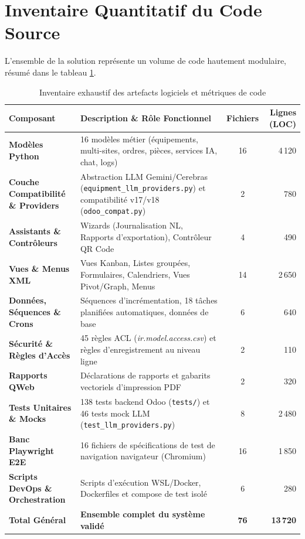 \section{Inventaire Quantitatif du Code Source}
L'ensemble de la solution représente un volume de code hautement modulaire, résumé dans le tableau \ref{tab:code_inventory}.

\begin{table}[!ht]
\centering
\small
\renewcommand{\arraystretch}{1.15}
\begin{tabularx}{\textwidth}{l p{7.2cm} c r}
\toprule
\textbf{Composant} & \textbf{Description \& Rôle Fonctionnel} & \textbf{Fichiers} & \textbf{Lignes (LOC)} \\
\midrule
\textbf{Modèles Python} & 16 modèles métier (équipements, multi-sites, ordres, pièces, services IA, chat, logs) & 16 & 4\,120 \\
\textbf{Couche Compatibilité \& Providers} & Abstraction LLM Gemini/Cerebras (\texttt{equipment\_llm\_providers.py}) et compatibilité v17/v18 (\texttt{odoo\_compat.py}) & 2 & 780 \\
\textbf{Assistants \& Contrôleurs} & Wizards (Journalisation NL, Rapports d'exportation), Contrôleur QR Code & 4 & 490 \\
\textbf{Vues \& Menus XML} & Vues Kanban, Listes groupées, Formulaires, Calendriers, Vues Pivot/Graph, Menus & 14 & 2\,650 \\
\textbf{Données, Séquences \& Crons} & Séquences d'incrémentation, 18 tâches planifiées automatiques, données de base & 6 & 640 \\
\textbf{Sécurité \& Règles d'Accès} & 45 règles ACL (\textit{ir.model.access.csv}) et règles d'enregistrement au niveau ligne & 2 & 110 \\
\textbf{Rapports QWeb} & Déclarations de rapports et gabarits vectoriels d'impression PDF & 2 & 320 \\
\textbf{Tests Unitaires \& Mocks} & 138 tests backend Odoo (\texttt{tests/}) et 46 tests mock LLM (\texttt{test\_llm\_providers.py}) & 8 & 2\,480 \\
\textbf{Banc Playwright E2E} & 16 fichiers de spécifications de test de navigation navigateur (Chromium) & 16 & 1\,850 \\
\textbf{Scripts DevOps \& Orchestration} & Scripts d'exécution WSL/Docker, Dockerfiles et compose de test isolé & 6 & 280 \\
\midrule
\textbf{Total Général} & \textbf{Ensemble complet du système validé} & \textbf{76} & \textbf{13\,720} \\
\bottomrule
\end{tabularx}
\caption{Inventaire exhaustif des artefacts logiciels et métriques de code}
\label{tab:code_inventory}
\end{table}

